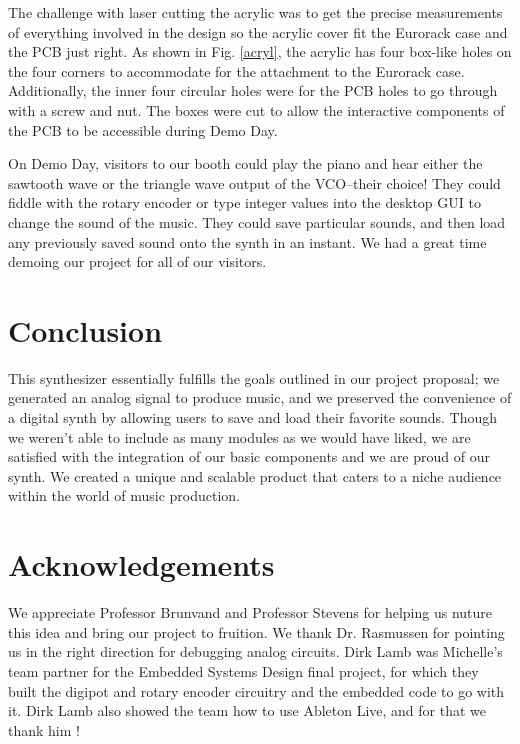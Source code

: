 \documentclass[letterpaper, 12 pt, conference]{ieeeconf}
\begin{document}
The challenge with laser cutting the acrylic was to get the precise measurements of everything involved in the design so the acrylic cover fit the Eurorack case and the PCB just right. As shown in Fig. \ref{acryl}, the acrylic has four box-like holes on the four corners to accommodate for the attachment to the Eurorack case. Additionally, the inner four circular holes were for the PCB holes to go through with a screw and nut. The boxes were cut to allow the interactive components of the PCB to be accessible during Demo Day. 

On Demo Day, visitors to our booth could play the piano and hear either the sawtooth wave or the triangle wave output of the VCO--their choice! They could fiddle with the rotary encoder or type integer values into the desktop GUI to change the sound of the music. They could save particular sounds, and then load any previously saved sound onto the synth in an instant. We had a great time demoing our project for all of our visitors. 

\section{Conclusion}

This synthesizer essentially fulfills the goals outlined in our project proposal; we generated an analog signal to produce music, and we preserved the convenience of a digital synth by allowing users to save and load their favorite sounds. Though we weren't able to include as many modules as we would have liked, we are satisfied with the integration of our basic components and we are proud of our synth. We created a unique and scalable product that caters to a niche audience within the world of music production.

\section{Acknowledgements}
We appreciate Professor Brunvand and Professor Stevens for helping us nuture this idea and bring our project to fruition. We thank Dr. Rasmussen for pointing us in the right direction for debugging analog circuits. Dirk Lamb was Michelle's team partner for the Embedded Systems Design final project, for which they built the digipot and rotary encoder circuitry and the embedded code to go with it. Dirk Lamb also showed the team how to use Ableton Live, and for that we thank him \cite{dirk}! 

\addtolength{\textheight}{-12cm}  
\end{document}
